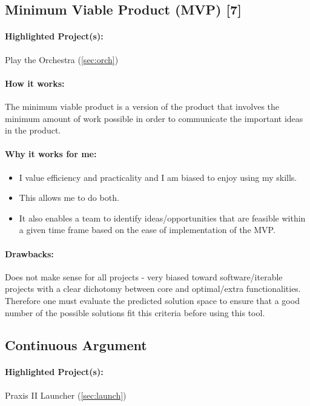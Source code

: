 \documentclass[a4paper,12pt]{article}
\begin{document}
\subsection{Minimum Viable Product (MVP) [7]}
\label{sec:MVP}
\paragraph{Highlighted Project(s): } Play the Orchestra (\ref{sec:orch})
\paragraph{How it works: }
The minimum viable product is a version of the product that involves the minimum amount of work possible in order to communicate the important ideas in the product.

\paragraph{Why it works for me: }

\begin{itemize}
\item I value efficiency and practicality and I am biased to enjoy using my skills.
\item This allows me to do both.
\item It also enables a team to identify ideas/opportunities that are feasible within a given time frame based on the ease of implementation of the MVP.
\end{itemize}

\paragraph{Drawbacks: }
Does not make sense for all projects - very biased toward software/iterable projects with a clear dichotomy between core and optimal/extra functionalities. Therefore one must evaluate the predicted solution space to ensure that a good number of the possible solutions fit this criteria before using this tool.

\subsection{Continuous Argument}
\label{sec:argue}
\paragraph{Highlighted Project(s): } Praxis II Launcher (\ref{sec:launch})
\end{document}
